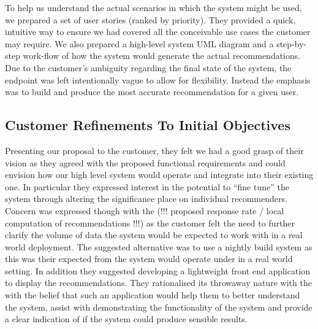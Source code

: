 \documentclass{l3proj}
\begin{document}
To help us understand the actual scenarios in which the system might be used, we prepared a set of user stories (ranked by priority). They provided a quick, intuitive way to ensure we had covered all the conceivable use cases the customer may require. We also prepared a high-level system UML diagram and a step-by-step work-flow of how the system would generate the actual recommendations. Due to the customer's ambiguity regarding the final state of the system, the endpoint was left intentionally vague to allow for flexibility. Instead the emphasis was to build and produce the most accurate recommendation for a given user. 


\subsection{Customer Refinements To Initial Objectives}
\label{sec:custrefineinitobj}


Presenting our proposal to the customer, they felt we had a good grasp of their vision as they agreed with the proposed functional requirements and could envision how our high level system would operate and integrate into their existing one. In particular they expressed interest in the potential to “fine tune” the system through altering the significance place on individual recommenders. Concern was expressed though with the (!!! proposed response rate / local computation of recommendations !!!) as the customer felt the need to further clarify the volume of data the system would be expected to work with in a real world deployment. The suggested alternative was to use a nightly build system as this was their expected from the system would operate under in a real world setting. In addition they suggested developing a lightweight front end application to display the recommendations. They rationalised its throwaway nature with the with the belief that such an application would help them to better understand the system, assist with demonstrating the functionality of the system and provide a clear indication of if the system could produce sensible results. 
\end{document}
